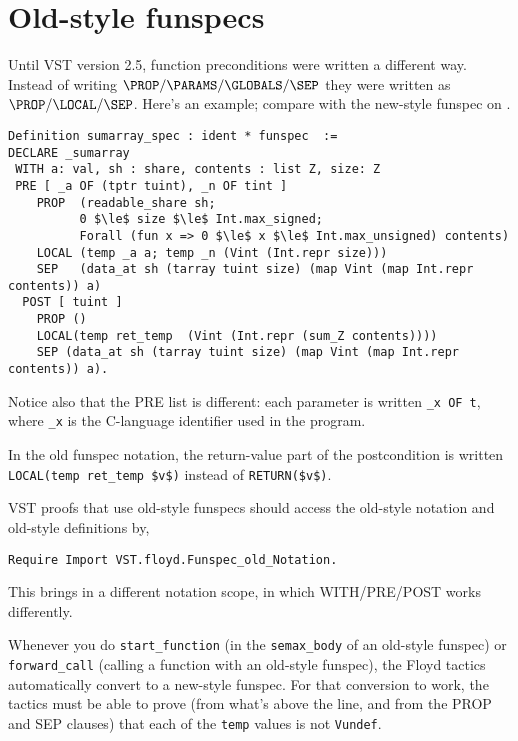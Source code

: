 \documentclass[12pt,fleqn,openany,oneside,showtrims]{memoir}
\begin{document}
\chapter{Old-style funspecs}
\label{refcard:old-funspec}

Until VST version 2.5, function preconditions were written a different way.
Instead of writing $\PROP/\PARAMS/\GLOBALS/\SEP$ they were written
as $\PROP/\LOCAL/\SEP$.  Here's an example; compare with the new-style
funspec on .

\begin{lstlisting}
Definition sumarray_spec : ident * funspec  :=
DECLARE _sumarray
 WITH a: val, sh : share, contents : list Z, size: Z
 PRE [ _a OF (tptr tuint), _n OF tint ]
    PROP  (readable_share sh;
          0 $\le$ size $\le$ Int.max_signed;
          Forall (fun x => 0 $\le$ x $\le$ Int.max_unsigned) contents)
    LOCAL (temp _a a; temp _n (Vint (Int.repr size)))
    SEP   (data_at sh (tarray tuint size) (map Vint (map Int.repr contents)) a)
  POST [ tuint ]
    PROP ()
    LOCAL(temp ret_temp  (Vint (Int.repr (sum_Z contents))))
    SEP (data_at sh (tarray tuint size) (map Vint (map Int.repr contents)) a).
\end{lstlisting}

Notice also that the PRE list is different: each parameter is written
\lstinline{_x OF t}, where \lstinline{_x} is the C-language identifier
used in the program.

In the old funspec notation, the return-value part of the postcondition
is written \lstinline{LOCAL(temp ret_temp $v$)}
instead of \lstinline{RETURN($v$)}.
 
VST proofs that use old-style funspecs should access the
old-style notation and old-style definitions by,
\begin{lstlisting}
Require Import VST.floyd.Funspec_old_Notation.
\end{lstlisting}

This brings in a different notation scope, in which WITH/PRE/POST works
differently.

Whenever you do \lstinline{start_function} (in the \lstinline{semax_body}
of an old-style funspec)
or \lstinline{forward_call} (calling a function with an old-style funspec),
the Floyd tactics automatically convert to a new-style funspec.
For that conversion to work, the tactics must be able to prove
(from what's above the line, and from the PROP and SEP clauses)
that each of the \lstinline{temp} values is not \lstinline{Vundef}.
\end{document}

